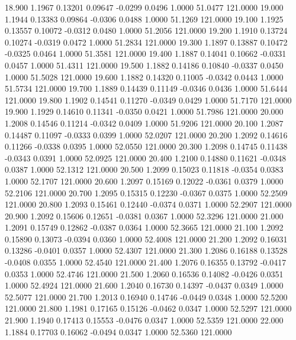   18.900   1.1967   0.13201   0.09647  -0.0299   0.0496   1.0000  51.0477 121.0000
  19.000   1.1944   0.13383   0.09864  -0.0306   0.0488   1.0000  51.1269 121.0000
  19.100   1.1925   0.13557   0.10072  -0.0312   0.0480   1.0000  51.2056 121.0000
  19.200   1.1910   0.13724   0.10274  -0.0319   0.0472   1.0000  51.2834 121.0000
  19.300   1.1897   0.13887   0.10472  -0.0325   0.0464   1.0000  51.3581 121.0000
  19.400   1.1887   0.14041   0.10662  -0.0331   0.0457   1.0000  51.4311 121.0000
  19.500   1.1882   0.14186   0.10840  -0.0337   0.0450   1.0000  51.5028 121.0000
  19.600   1.1882   0.14320   0.11005  -0.0342   0.0443   1.0000  51.5734 121.0000
  19.700   1.1889   0.14439   0.11149  -0.0346   0.0436   1.0000  51.6444 121.0000
  19.800   1.1902   0.14541   0.11270  -0.0349   0.0429   1.0000  51.7170 121.0000
  19.900   1.1929   0.14610   0.11341  -0.0350   0.0421   1.0000  51.7986 121.0000
  20.000   1.2008   0.14546   0.11214  -0.0342   0.0409   1.0000  51.9206 121.0000
  20.100   1.2087   0.14487   0.11097  -0.0333   0.0399   1.0000  52.0207 121.0000
  20.200   1.2092   0.14616   0.11266  -0.0338   0.0395   1.0000  52.0550 121.0000
  20.300   1.2098   0.14745   0.11438  -0.0343   0.0391   1.0000  52.0925 121.0000
  20.400   1.2100   0.14880   0.11621  -0.0348   0.0387   1.0000  52.1312 121.0000
  20.500   1.2099   0.15023   0.11818  -0.0354   0.0383   1.0000  52.1707 121.0000
  20.600   1.2097   0.15169   0.12022  -0.0361   0.0379   1.0000  52.2106 121.0000
  20.700   1.2095   0.15315   0.12230  -0.0367   0.0375   1.0000  52.2509 121.0000
  20.800   1.2093   0.15461   0.12440  -0.0374   0.0371   1.0000  52.2907 121.0000
  20.900   1.2092   0.15606   0.12651  -0.0381   0.0367   1.0000  52.3296 121.0000
  21.000   1.2091   0.15749   0.12862  -0.0387   0.0364   1.0000  52.3665 121.0000
  21.100   1.2092   0.15890   0.13073  -0.0394   0.0360   1.0000  52.4008 121.0000
  21.200   1.2092   0.16031   0.13286  -0.0401   0.0357   1.0000  52.4307 121.0000
  21.300   1.2086   0.16188   0.13528  -0.0408   0.0355   1.0000  52.4540 121.0000
  21.400   1.2076   0.16355   0.13792  -0.0417   0.0353   1.0000  52.4746 121.0000
  21.500   1.2060   0.16536   0.14082  -0.0426   0.0351   1.0000  52.4924 121.0000
  21.600   1.2040   0.16730   0.14397  -0.0437   0.0349   1.0000  52.5077 121.0000
  21.700   1.2013   0.16940   0.14746  -0.0449   0.0348   1.0000  52.5200 121.0000
  21.800   1.1981   0.17165   0.15126  -0.0462   0.0347   1.0000  52.5297 121.0000
  21.900   1.1940   0.17413   0.15553  -0.0476   0.0347   1.0000  52.5359 121.0000
  22.000   1.1884   0.17703   0.16062  -0.0494   0.0347   1.0000  52.5360 121.0000

